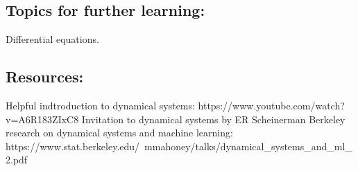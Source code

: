 \documentclass{article}
\begin{document}

\subsection{Topics for further learning:}
Differential equations.

\subsection{Resources:}
Helpful indtroduction to dynamical systems: https://www.youtube.com/watch?v=A6R183ZIxC8
Invitation to dynamical systems by ER Scheinerman
Berkeley research on dynamical systems and machine learning: https://www.stat.berkeley.edu/~mmahoney/talks/dynamical_systems_and_ml_2.pdf
\end{document}
